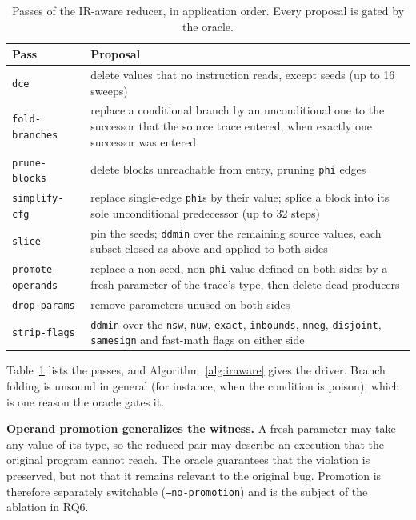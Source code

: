\documentclass[conference]{IEEEtran}
\newcommand{\cn}[1]{\texttt{#1}}   %
\begin{document}
\begin{table}[t]
\caption{Passes of the IR-aware reducer, in application order. Every proposal is gated by the oracle.}
\label{tab:passes}
\centering\footnotesize
\begin{tabular}{@{}p{2.75cm}p{4.75cm}@{}}
\toprule
Pass & Proposal \\
\midrule
\cn{dce} & delete values that no instruction reads, except seeds (up to 16 sweeps) \\
\cn{fold-branches} & replace a conditional branch by an unconditional one to the successor that the source trace entered, when exactly one successor was entered \\
\cn{prune-blocks} & delete blocks unreachable from entry, pruning \texttt{phi} edges \\
\cn{simplify-cfg} & replace single-edge \texttt{phi}s by their value; splice a block into its sole unconditional predecessor (up to 32 steps) \\
\cn{slice} & pin the seeds; \texttt{ddmin} over the remaining source values, each subset closed as above and applied to both sides \\
\cn{promote-operands} & replace a non-seed, non-\texttt{phi} value defined on both sides by a fresh parameter of the trace's type, then delete dead producers \\
\cn{drop-params} & remove parameters unused on both sides \\
\cn{strip-flags} & \texttt{ddmin} over the \texttt{nsw}, \texttt{nuw}, \texttt{exact}, \texttt{inbounds}, \texttt{nneg}, \texttt{disjoint}, \texttt{samesign} and fast-math flags on either side \\
\bottomrule
\end{tabular}
\end{table}

Table~\ref{tab:passes} lists the passes, and Algorithm~\ref{alg:iraware} gives the driver. Branch folding is unsound in general (for instance, when the condition is poison), which is one reason the oracle gates it.

\textbf{Operand promotion generalizes the witness.} A fresh parameter may take any value of its type, so the reduced pair may describe an execution that the original program cannot reach. The oracle guarantees that the violation is preserved, but not that it remains relevant to the original bug. Promotion is therefore separately switchable (\texttt{--no-promotion}) and is the subject of the ablation in RQ6.
\end{document}
